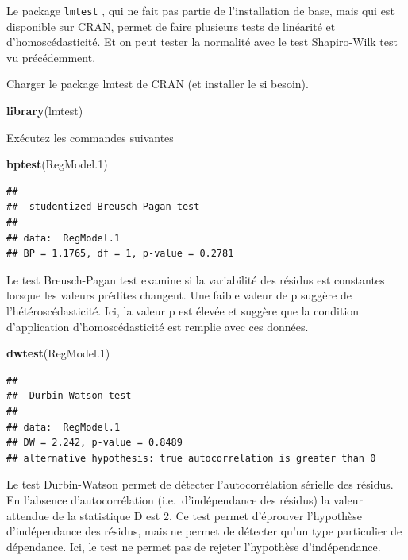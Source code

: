 \documentclass[12pt,]{book}
\makeatletter
\newenvironment{Shaded}{\begin{snugshade}}{\end{snugshade}}
\newcommand{\FloatTok}[1]{\textcolor[rgb]{0.06,0.06,0.06}{#1}}
\newcommand{\KeywordTok}[1]{\textcolor[rgb]{0.27,0.27,0.27}{\textbf{#1}}}
\newcommand{\NormalTok}[1]{#1}
\newenvironment{kframe}{%
\medskip{}
\setlength{\fboxsep}{.8em}
 \def\at@end@of@kframe{}%
 \ifinner\ifhmode%
  \def\at@end@of@kframe{\end{minipage}}%
  \begin{minipage}{\columnwidth}%
 \fi\fi%
 \def\FrameCommand##1{\hskip\@totalleftmargin \hskip-\fboxsep
 \colorbox{shadecolor}{##1}\hskip-\fboxsep
     \hskip-\linewidth \hskip-\@totalleftmargin \hskip\columnwidth}%
 \MakeFramed {\advance\hsize-\width
   \@totalleftmargin\z@ \linewidth\hsize
   \@setminipage}}%
 {\par\unskip\endMakeFramed%
 \at@end@of@kframe}
\newenvironment{rmdblock}[1]
  {
  \begin{itemize}
  \renewcommand{\labelitemi}{
    \raisebox{-.7\height}[0pt][0pt]{
      {\setkeys{Gin}{width=3em,keepaspectratio}\texttt{[image: images/\#1]}}
    }
  }
  \setlength{\fboxsep}{1em}
  \begin{kframe}
  \item
  }
  {
  \end{kframe}
  \end{itemize}
  }
\newenvironment{rmdcode}
  {\begin{rmdblock}{screen}}
  {\end{rmdblock}}
\makeatother
\begin{document}
Le package \texttt{lmtest} , qui ne fait pas partie de l'installation de base, mais qui est disponible sur CRAN, permet de faire plusieurs tests de linéarité et d'homoscédasticité. Et on peut tester la normalité avec le test Shapiro-Wilk test vu précédemment.

\begin{rmdcode}
Charger le package lmtest de CRAN (et installer le si besoin).
\end{rmdcode}

\begin{Shaded}
\begin{Highlighting}[]
\KeywordTok{library}\NormalTok{(lmtest)}
\end{Highlighting}
\end{Shaded}

\begin{rmdcode}
Exécutez les commandes suivantes
\end{rmdcode}

\begin{Shaded}
\begin{Highlighting}[]
\KeywordTok{bptest}\NormalTok{(RegModel}\FloatTok{.1}\NormalTok{)}
\end{Highlighting}
\end{Shaded}

\begin{verbatim}
## 
## 	studentized Breusch-Pagan test
## 
## data:  RegModel.1
## BP = 1.1765, df = 1, p-value = 0.2781
\end{verbatim}

Le test Breusch-Pagan test examine si la variabilité des résidus est constantes lorsque les valeurs prédites changent. Une faible valeur de p suggère de l'hétéroscédasticité. Ici, la valeur p est élevée et suggère que la condition d'application d'homoscédasticité est remplie avec ces données.

\begin{Shaded}
\begin{Highlighting}[]
\KeywordTok{dwtest}\NormalTok{(RegModel}\FloatTok{.1}\NormalTok{)}
\end{Highlighting}
\end{Shaded}

\begin{verbatim}
## 
## 	Durbin-Watson test
## 
## data:  RegModel.1
## DW = 2.242, p-value = 0.8489
## alternative hypothesis: true autocorrelation is greater than 0
\end{verbatim}

Le test Durbin-Watson permet de détecter l'autocorrélation sérielle des résidus. En l'absence d'autocorrélation (i.e.~d'indépendance des résidus) la valeur attendue de la statistique D est 2. Ce test permet d'éprouver l'hypothèse d'indépendance des résidus, mais ne permet de détecter qu'un type particulier de dépendance. Ici, le test ne permet pas de rejeter l'hypothèse d'indépendance.
\end{document}

